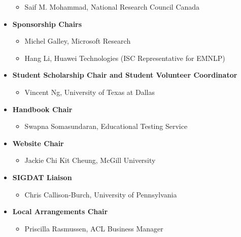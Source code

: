 \begin{itemize}[itemsep=7pt, leftmargin=0cm, label={}]
\begin{itemize}[nosep, leftmargin=0.5cm, label={}]
\item Saif M. Mohammad, National Research Council Canada 
\end{itemize}
\item \textbf{Sponsorship Chairs}

\begin{itemize}[nosep, leftmargin=0.5cm, label={}]
\item Michel Galley, Microsoft Research 
\item Hang Li, Huawei Technologies (ISC Representative for EMNLP) 
\end{itemize}
\item \textbf{Student Scholarship Chair and Student Volunteer Coordinator}

\begin{itemize}[nosep, leftmargin=0.5cm, label={}]
\item Vincent Ng, University of Texas at Dallas 
\end{itemize}
\item \textbf{Handbook Chair}

\begin{itemize}[nosep, leftmargin=0.5cm, label={}]
\item Swapna Somasundaran, Educational Testing Service
\end{itemize}
\item \textbf{Website Chair}

\begin{itemize}[nosep, leftmargin=0.5cm, label={}]
\item Jackie Chi Kit Cheung, McGill University 
\end{itemize}
\item \textbf{SIGDAT Liaison}

\begin{itemize}[nosep, leftmargin=0.5cm, label={}]
\item Chris Callison-Burch, University of Pennsylvania
\end{itemize}
\item \textbf{Local Arrangements Chair}

\begin{itemize}[nosep, leftmargin=0.5cm, label={}]
\item Priscilla Rasmussen, ACL Business Manager 
\end{itemize}


\end{itemize}
